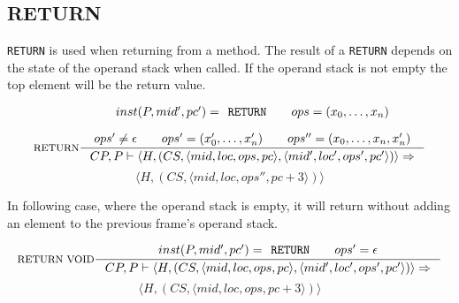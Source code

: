 \subsection{RETURN}
\texttt{RETURN} is used when returning from a method.
The result of a \texttt{RETURN} depends on the state of the operand stack when called.
If the operand stack is not empty the top element will be the return value.

$$\inference[RETURN]{
inst(P,mid',pc') = \texttt{RETURN} \semsp
ops = (x_0, \ldots, x_n) \semnl \\
ops' \neq \epsilon \semsp
ops' = (x'_0, \ldots, x'_n) \semsp
ops'' = (x_0, \ldots, x_n, x'_n)} 
{CP, P \vdash \langle H, (CS, \langle mid, loc, ops, pc \rangle, \langle mid', loc', ops', pc' \rangle)\rangle \Rightarrow}$$
$$ \langle H, (CS, \langle mid, loc, ops'', pc + 3 \rangle)\rangle$$

In following case, where the operand stack is empty, it will return without adding an element to the previous frame's operand stack.

$$\inference[RETURN VOID]{
inst(P,mid',pc') = \texttt{RETURN} \semsp
ops' = \epsilon }
{CP, P \vdash \langle H, (CS, \langle mid, loc, ops, pc \rangle, \langle mid', loc', ops', pc' \rangle)\rangle \Rightarrow}$$
$$ \langle H, (CS, \langle mid, loc, ops, pc + 3 \rangle)\rangle$$
